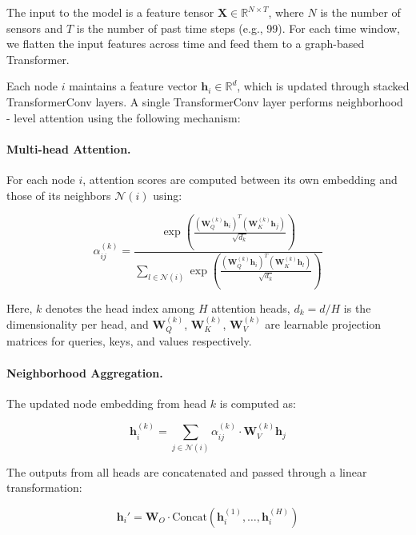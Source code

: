 \documentclass[runningheads]{llncs}
\begin{document}
The input to the model is a feature tensor $\mathbf{X} \in \mathbb{R}^{N \times T}$, where $N$ is the number of sensors and $T$ is the number of past time steps (e.g., 99). For each time window, we flatten the input features across time and feed them to a graph-based Transformer.

Each node $i$ maintains a feature vector $\mathbf{h}_i \in \mathbb{R}^{d}$, which is updated through stacked TransformerConv layers. A single TransformerConv layer performs neighborhood - level attention using the following mechanism:

\paragraph{Multi-head Attention.} For each node $i$, attention scores are computed between its own embedding and those of its neighbors $\mathcal{N}(i)$ using:

\begin{equation}
\alpha_{ij}^{(k)} = \frac{
    \exp\left(\frac{(\mathbf{W}_Q^{(k)} \mathbf{h}_i)^T (\mathbf{W}_K^{(k)} \mathbf{h}_j)}{\sqrt{d_k}}\right)
}{
    \sum_{l \in \mathcal{N}(i)} \exp\left(\frac{(\mathbf{W}_Q^{(k)} \mathbf{h}_i)^T (\mathbf{W}_K^{(k)} \mathbf{h}_l)}{\sqrt{d_k}}\right)
}
\end{equation}

Here, $k$ denotes the head index among $H$ attention heads, $d_k = d / H$ is the dimensionality per head, and $\mathbf{W}_Q^{(k)}$, $\mathbf{W}_K^{(k)}$, $\mathbf{W}_V^{(k)}$ are learnable projection matrices for queries, keys, and values respectively.

\paragraph{Neighborhood Aggregation.} The updated node embedding from head $k$ is computed as:

\begin{equation}
\mathbf{h}_i^{(k)} = \sum_{j \in \mathcal{N}(i)} \alpha_{ij}^{(k)} \cdot \mathbf{W}_V^{(k)} \mathbf{h}_j
\end{equation}

The outputs from all heads are concatenated and passed through a linear transformation:

\begin{equation}
\mathbf{h}_i' = \mathbf{W}_O \cdot \text{Concat}(\mathbf{h}_i^{(1)}, \dots, \mathbf{h}_i^{(H)})
\end{equation}
\end{document}
